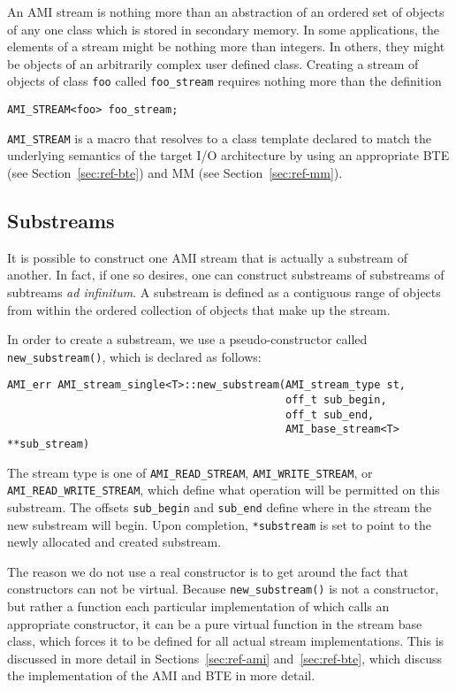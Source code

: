 An AMI stream is nothing more than an abstraction
of an ordered set of objects of any one class which is stored in
secondary memory.  In some applications, the elements of a stream
might be nothing more than integers.  In others, they might be objects
of an arbitrarily complex user defined class.  Creating a stream of
objects of class \verb|foo| called \verb|foo_stream| requires nothing
more than the definition

\begin{verbatim}
AMI_STREAM<foo> foo_stream;
\end{verbatim}

\verb|AMI_STREAM| is a macro that resolves to a class
template declared to match the underlying semantics of the target I/O
architecture by using an appropriate BTE
(see Section~\ref{sec:ref-bte}) and MM 
(see Section~\ref{sec:ref-mm}).


\subsection{Substreams}

It is possible to construct one AMI stream that is actually a
substream of another.  In fact, if one so desires, one can construct
substreams of substreams of subtreams {\em ad infinitum}.  A substream
is defined as a contiguous range of objects from within the ordered
collection of objects that make up the stream.

In order to create a substream, we use a pseudo-constructor called
\verb|new_substream()|, which is declared as follows:
\begin{verbatim}
AMI_err AMI_stream_single<T>::new_substream(AMI_stream_type st,
                                            off_t sub_begin,
                                            off_t sub_end,
                                            AMI_base_stream<T> **sub_stream)
\end{verbatim}
The stream type is one of \verb|AMI_READ_STREAM|,
\verb|AMI_WRITE_STREAM|, or \verb|AMI_READ_WRITE_STREAM|, which define
what operation will be permitted on this substream.  The offsets
\verb|sub_begin| and \verb|sub_end| define where in the stream the new
substream will begin.  Upon completion, \verb|*substream| is set to
point to the newly allocated and created substream.

The reason we do not use a real constructor is to get around the fact
that constructors can not be virtual.  Because \verb|new_substream()|
is not a constructor, but rather a function each particular
implementation of which calls an appropriate constructor, it can be a
pure virtual function in the stream base class, which forces it to be
defined for all actual stream implementations.  This is discussed in
more detail in Sections~\ref{sec:ref-ami} and~\ref{sec:ref-bte}, which
discuss the implementation of the AMI and BTE in more detail.

